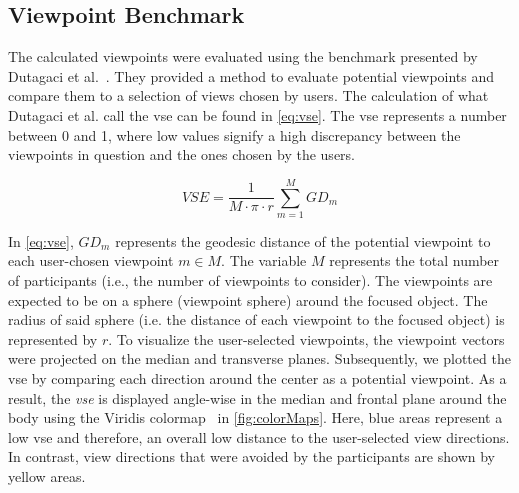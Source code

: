 \subsection{Viewpoint Benchmark \label{sec:benchmark}}
The calculated viewpoints were evaluated using the benchmark presented by Dutagaci et al.~\cite{dutagaci2010bbv}. They provided a method to evaluate potential viewpoints and compare them to a selection of views chosen by users. The calculation of what Dutagaci et al. call the \acrfull{vse} can be found in \autoref{eq:vse}. The \acrshort{vse} represents a number between 0 and 1, where low values signify a high discrepancy between the viewpoints in question and the ones chosen by the users.

\begin{equation}
	\label{eq:vse}
	VSE = \frac{1}{M \cdot \pi \cdot r}\sum_{m=1}^{M} GD_{m}
\end{equation}

In \autoref{eq:vse}, \(GD_m\) represents the geodesic distance of the potential viewpoint to each user-chosen viewpoint \(m \in M\). The variable $M$ represents the total number of participants (i.e., the number of viewpoints to consider). The viewpoints are expected to be on a sphere (viewpoint sphere) around the focused object. The radius of said sphere (i.e. the distance of each viewpoint to the focused object) is represented by $r$. To visualize the user-selected viewpoints, the viewpoint vectors were projected on the median and transverse planes. Subsequently, we plotted the \acrshort{vse} by comparing each direction around the center as a potential viewpoint. As a result, the \emph{\acrshort{vse}} is displayed angle-wise in the median and frontal plane around the body using the Viridis colormap~\cite{viridis} in \autoref{fig:colorMaps}. Here, blue areas represent a low \acrshort{vse} and therefore, an overall low distance to the user-selected view directions. In contrast, view directions that were avoided by the participants are shown by yellow areas.

